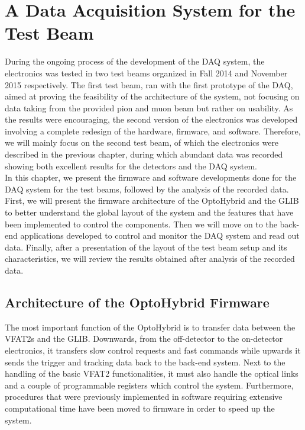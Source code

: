 \chapter{A Data Acquisition System for the Test Beam}
\label{chap:II-3-test-beam}

  During the ongoing process of the development of the DAQ system, the electronics was tested in two test beams organized in Fall 2014 and November 2015 respectively. The first test beam, ran with the first prototype of the DAQ, aimed at proving the feasibility of the architecture of the system, not focusing on data taking from the provided pion and muon beam but rather on usability. As the results were encouraging, the second version of the electronics was developed involving a complete redesign of the hardware, firmware, and software. Therefore, we will mainly focus on the second test beam, of which the electronics were described in the previous chapter, during which abundant data was recorded showing both excellent results for the detectors and the DAQ system. \\

  In this chapter, we present the firmware and software developments done for the DAQ system for the test beams, followed by the analysis of the recorded data. First, we will present the firmware architecture of the OptoHybrid and the GLIB to better understand the global layout of the system and the features that have been implemented to control the components. Then we will move on to the back-end applications developed to control and monitor the DAQ system and read out data. Finally, after a presentation of the layout of the test beam setup and its characteristics, we will review the results obtained after analysis of the recorded data.

  \section{Architecture of the OptoHybrid Firmware}

    The most important function of the OptoHybrid is to transfer data between the VFAT2s and the GLIB. Downwards, from the off-detector to the on-detector electronics, it transfers slow control requests and fast commands while upwards it sends the trigger and tracking data back to the back-end system. Next to the handling of the basic VFAT2 functionalities, it must also handle the optical links and a couple of programmable registers which control the system. Furthermore, procedures that were previously implemented in software requiring extensive computational time have been moved to firmware in order to speed up the system. \\

